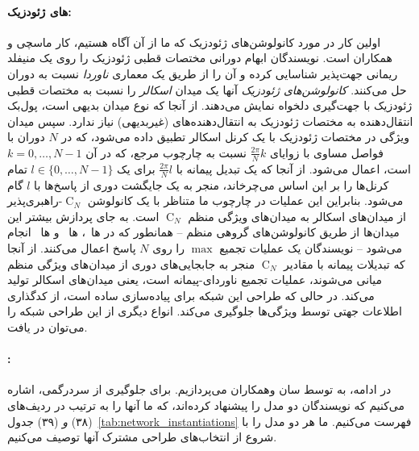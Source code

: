 \paragraph{های ژئودزیک:}
اولین کار در مورد کانولوشن‌های ژئودزیک که ما از آن آگاه هستیم، کار ماسچی و همکاران\cite{masci2015geodesic} است.
نویسندگان ابهام دورانی مختصات قطبی ژئودزیک را روی یک منیفلد ریمانی جهت‌پذیر شناسایی کرده و آن را از طریق یک معماری \emph{ناوردا} نسبت به دوران حل می‌کنند.
\emph{کانولوشن‌های ژئودزیک} آنها یک میدان \emph{اسکالر} را نسبت به مختصات قطبی ژئودزیک با جهت‌گیری دلخواه نمایش می‌دهند.
از آنجا که نوع میدان بدیهی است، پول‌بک انتقال‌دهنده به مختصات ژئودزیک به انتقال‌دهنده‌های (غیربدیهی) نیاز ندارد.
سپس میدان ویژگی در مختصات ژئودزیک با یک کرنل اسکالر تطبیق داده می‌شود، که در $N$ دوران با فواصل مساوی با زوایای $\frac{2\pi}{N}k$ نسبت به چارچوب مرجع، که در آن $k=0,\dots,N-1$ است، اعمال می‌شود.
از آنجا که یک تبدیل پیمانه با $\frac{2\pi}{N}l$ برای یک $l\in\{0,\dots,N-1\}$ تمام کرنل‌ها را بر این اساس می‌چرخاند، منجر به یک جایگشت دوری از پاسخ‌ها با $l$ گام می‌شود.
بنابراین این عملیات در چارچوب ما متناظر با یک کانولوشن $\operatorname{C}_N$-راهبری‌پذیر از میدان‌های اسکالر به میدان‌های ویژگی منظم $\operatorname{C}_N$ است.
به جای پردازش بیشتر این میدان‌ها از طریق کانولوشن‌های گروهی منظم
-- همانطور که در ها~\cite{poulenard2018multi}، ها~\cite{Yang2020parallelFrameCNN} و ها~\cite{deHaan2020meshCNNs} انجام می‌شود --
نویسندگان یک عملیات تجمیع $\max$ را روی $N$ پاسخ اعمال می‌کنند.
از آنجا که تبدیلات پیمانه با مقادیر $\operatorname{C}_N$ منجر به جابجایی‌های دوری از میدان‌های ویژگی منظم میانی می‌شوند، عملیات تجمیع ناوردای-پیمانه است، یعنی میدان‌های اسکالر تولید می‌کند.
در حالی که طراحی این شبکه برای پیاده‌سازی ساده است، از کدگذاری اطلاعات جهتی توسط ویژگی‌ها جلوگیری می‌کند.
انواع دیگری از این طراحی شبکه را می‌توان در \cite{masci2015shapenet,monti2017geometric} یافت.







\paragraph{:}
در ادامه، به \emph{} توسط سان وهمکاران\cite{sun2018zernet} می‌پردازیم.
برای جلوگیری از سردرگمی، اشاره می‌کنیم که نویسندگان دو مدل را پیشنهاد کرده‌اند، که ما آنها را به ترتیب در ردیف‌های (۳۸) \emph{و} (۳۹) جدول~\ref{tab:network_instantiations} فهرست می‌کنیم.
ما هر دو مدل را با شروع از انتخاب‌های طراحی مشترک آنها توصیف می‌کنیم.

